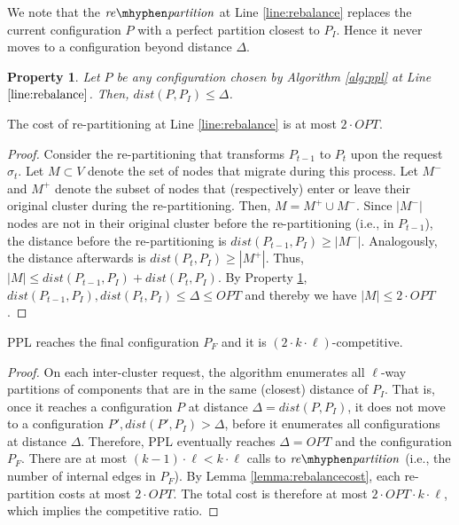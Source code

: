 \documentclass[manuscript,screen=true]{acmart}
\newcommand{\OPT}{\mathit{OPT}}
\newtheorem{property}{Property}
\newcommand\mahmoud[1]{\color{green}\textbf{\\ Mahmoud: #1}\\\color{black}}
\newcommand\maciek[1]{\color{brown}\textbf{\\ Maciek: #1}\color{black}}
\begin{document}
      We note that the $\mathit{re\mhyphen partition}$ at Line \ref{line:rebalance} replaces the current configuration $P$ with a perfect partition closest to $P_I$.
Hence it never moves to a configuration beyond distance $\Delta$.      
\begin{property} \label{prop:dist<OPT}
    Let $P$ be any configuration chosen by Algorithm \ref{alg:ppl} at Line $\ref{line:rebalance}$.
    Then, $\mathit{dist}(P,P_I) \leq \Delta$.
\end{property}

\begin{lemma}	\label{lemma:rebalancecost}
    The cost of re-partitioning at Line \ref{line:rebalance} is at most $2\cdot\OPT$.
\end{lemma}
\begin{proof}
    Consider the re-partitioning that transforms $P_{t-1}$ to $P_t$ upon the request $\sigma_t$.
    Let $M \subset V$ denote the set of nodes that migrate during this process.
	Let $M^-$ and $M^+$ denote the subset of nodes that (respectively)
    enter or leave their original cluster during the re-partitioning.    
    Then,
    $M = M^+ \cup M^-$.
    Since $|M^-|$ nodes are not in their original cluster before the re-partitioning (i.e., in $P_{t-1}$),
    the distance before the re-partitioning is $\mathit{dist}(P_{t-1},P_I) \geq | M^-|$.
    Analogously,
     the distance afterwards is $\mathit{dist}(P_{t},P_I) \geq | M^+|$.
    Thus,
    $|M| \leq \mathit{dist}(P_{t-1},P_I) + \mathit{dist}(P_{t},P_I)$.
    By Property \ref{prop:dist<OPT},
    $\mathit{dist}(P_{t-1},P_I) , \mathit{dist}(P_{t},P_I) \leq \Delta \leq \OPT$
    and thereby we have	
    $|M| \leq 2\cdot\OPT$.
\end{proof}

\begin{theorem}	\label{thm:upperbound}
    PPL reaches the final configuration $P_F$ and it is $(2\cdot k\cdot\ell)$-competitive.
\end{theorem}
\begin{proof}
      On each inter-cluster request,
     the algorithm enumerates all $\ell$-way partitions of components
     that are in the same (closest) distance of $P_I$.
     That is, 
     once it reaches a configuration $P$ at distance $\Delta = \mathit{dist} (P, P_I)$,
     it does not move to a configuration
     $P', \mathit{dist} (P', P_I) > \Delta$,
     before it enumerates all configurations at distance $\Delta$.
     Therefore,
     PPL eventually reaches $\Delta=\OPT$ and the configuration $P_F$.
    There are at most $(k-1)\cdot\ell < k\cdot\ell $ calls   to $\mathit{re\mhyphen partition}$
     (i.e., the number of internal edges in $P_F$).
    By Lemma \ref{lemma:rebalancecost},
    each re-partition costs at most $2\cdot\OPT$.
    The total cost is therefore at most $2\cdot\OPT\cdot k\cdot\ell$, which implies the competitive ratio.
 \end{proof}
\end{document}
